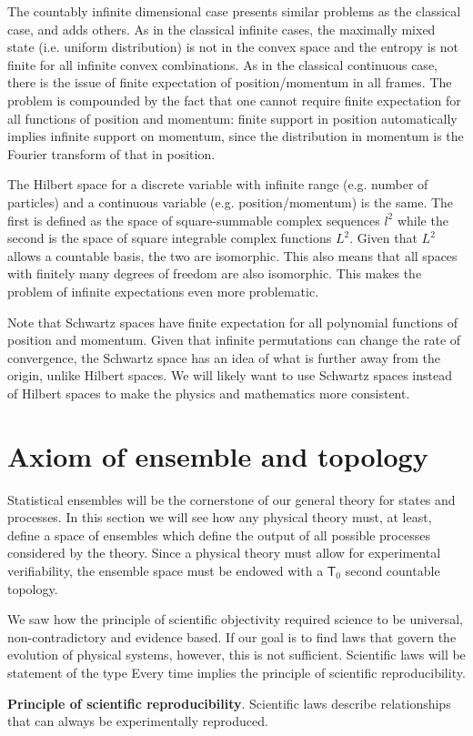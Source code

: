 The countably infinite dimensional case presents similar problems as the classical case, and adds others. As in the classical infinite cases, the maximally mixed state (i.e. uniform distribution) is not in the convex space and the entropy is not finite for all infinite convex combinations. As in the classical continuous case, there is the issue of finite expectation of position/momentum in all frames. The problem is compounded by the fact that one cannot require finite expectation for all functions of position and momentum: finite support in position automatically implies infinite support on momentum, since the distribution in momentum is the Fourier transform of that in position.

The Hilbert space for a discrete variable with infinite range (e.g. number of particles) and a continuous variable (e.g. position/momentum) is the same. The first is defined as the space of square-summable complex sequences $l^2$ while the second is the space of square integrable complex functions $L^2$. Given that $L^2$ allows a countable basis, the two are isomorphic. This also means that all spaces with finitely many degrees of freedom are also isomorphic. This makes the problem of infinite expectations even more problematic.

Note that Schwartz spaces have finite expectation for all polynomial functions of position and momentum. Given that infinite permutations can change the rate of convergence, the Schwartz space has an idea of what is further away from the origin, unlike Hilbert spaces. We will likely want to use Schwartz spaces instead of Hilbert spaces to make the physics and mathematics more consistent.

\section{Axiom of ensemble and topology}

Statistical ensembles will be the cornerstone of our general theory for states and processes. In this section we will see how any physical theory must, at least, define a space of ensembles which define the output of all possible processes considered by the theory. Since a physical theory must allow for experimental verifiability, the ensemble space must be endowed with a $\mathsf{T}_0$ second countable topology.

We saw how the principle of scientific objectivity required science to be universal, non-contradictory and evidence based. If our goal is to find laws that govern the evolution of physical systems, however, this is not sufficient. Scientific laws will be statement of the type  Every time implies the principle of scientific reproducibility.
\begin{mathSection}
	\textbf{Principle of scientific reproducibility}.
	Scientific laws describe relationships that can always be experimentally reproduced.
\end{mathSection}

